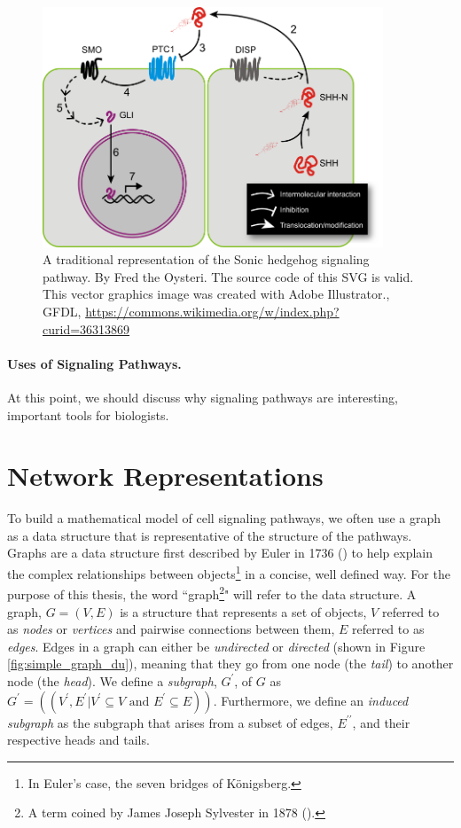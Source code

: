 \documentclass[12pt,twoside]{reedthesis}
\theoremstyle{definition}
\begin{document}
 \begin{figure}[!h]
   \begin{center}
     \includegraphics[width=4in]{Sonic_hedgehog_pathway}
   \caption[Sonic hedgehog signal transduction.]{A traditional representation of the Sonic hedgehog signaling pathway. By Fred the Oysteri. The source code of this SVG is valid. This vector graphics image was created with Adobe Illustrator., GFDL, \url{https://commons.wikimedia.org/w/index.php?curid=36313869}}
   \label{fig:shh}
   \end{center}
 \end{figure}

 \paragraph{Uses of Signaling Pathways.}At this point, we should discuss why signaling pathways are interesting, important tools for biologists.

 \section{Network Representations}

  To build a mathematical model of cell signaling pathways, we often use a graph as a data structure that is representative of the structure of the pathways. Graphs are a data structure first described by Euler in 1736 (\cite{Shields2012}) to help explain the complex relationships between objects\footnote{In Euler's case, the seven bridges of K\"{o}nigsberg.} in a concise, well defined way. For the purpose of this thesis, the word ``graph\footnote{A term coined by James Joseph Sylvester in 1878 (\cite{Biggs1986}).}" will refer to the data structure. A graph, $G=(V,E)$ is a structure that represents a set of objects, $V$ referred to as \textit{nodes} or \textit{vertices} and pairwise connections between them, $E$ referred to as \textit{edges}. Edges in a graph can either be \textit{undirected} or \textit{directed} (shown in Figure \ref{fig:simple_graph_du}), meaning that they go from one node (the \textit{tail}) to another node (the \textit{head}). We define a \textit{subgraph}, $G^\prime$, of $G$ as $G^\prime=((V^\prime,E^\prime | V^\prime \subseteq V \text{ and } E^\prime \subseteq E))$. Furthermore, we define an \textit{induced subgraph} as the subgraph that arises from a subset of edges, $E^{\prime\prime}$, and their respective heads and tails.\par
\end{document}
